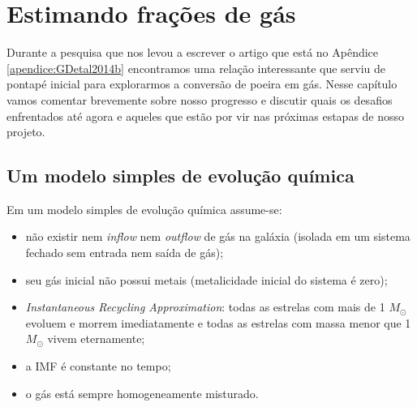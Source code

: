 



\chapter{Estimando frações de gás}
\label{sec:gasfrac}

Durante a pesquisa que nos levou a escrever o artigo que está no Apêndice \ref{apendice:GDetal2014b}
encontramos uma relação interessante que serviu de pontapé inicial para explorarmos a conversão de
poeira em gás. Nesse capítulo vamos comentar brevemente sobre nosso progresso e discutir quais os
desafios enfrentados até agora e aqueles que estão por vir nas próximas estapas de nosso projeto.

\section{Um modelo simples de evolução química}
\label{sec:gasfrac:closedbox}

Em um modelo simples de evolução química assume-se:
\begin{itemize}
	\setlength\itemsep{0.2cm}
  	\item não existir nem {\em inflow} nem {\em outflow} de gás na galáxia (isolada em um sistema
fechado sem entrada nem saída de gás);
  	\item seu gás inicial não possui metais (metalicidade inicial do sistema é zero);
  	\item {\em Instantaneous Recycling Approximation}: todas as estrelas com mais de 1
$M_\odot$ evoluem e morrem imediatamente e todas as estrelas com massa menor que 1 $M_\odot$ vivem
eternamente;
	\item a IMF é constante no tempo;
	\item o gás está sempre homogeneamente misturado.
\end{itemize}

